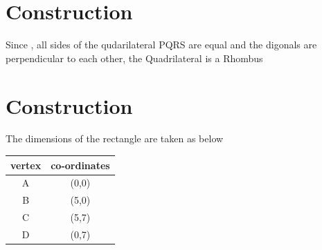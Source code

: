\documentclass[journal,10pt,twocolumn]{article}
\begin{document}
\section*{Construction}
Since , all sides of the qudarilateral PQRS are equal and the digonals are perpendicular to each other, the Quadrilateral is a Rhombus



\section*{Construction}
The dimensions of the rectangle are taken as below\\
{
\setlength\extrarowheight{2pt}
\centering
	\begin{tabular}{|c|c|}
	\hline
	\textbf{vertex}&\textbf{co-ordinates}\\
	\hline
	A&(0,0)\\
	\hline
	B&(5,0)\\
	\hline
	C&(5,7)\\
	\hline
	D&(0,7)\\
	\hline
\end{tabular}
}
\end{document}
